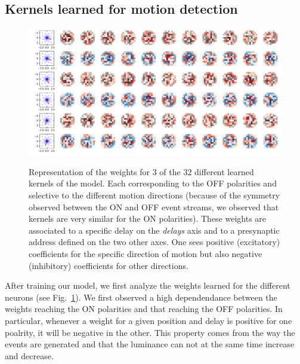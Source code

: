 \documentclass[default]{sn-jnl}%
\theoremstyle{thmstyleone}%
\theoremstyle{thmstyletwo}%
\theoremstyle{thmstylethree}%
\newcommand{\seeFig}[1]{see Fig.~\ref{fig:#1}}%
\begin{document}
\subsection{Kernels learned for motion detection}
\begin{figure}[ht!]
    {\centering
    \includegraphics[width=\linewidth]{figures/motion_kernels.pdf}
    }
    \caption{
    	Representation of the weights for $3$ of the $32$ different learned kernels of the model. Each corresponding to the OFF polarities and selective to the different motion directions (because of the symmetry observed between the ON and OFF event streams, we observed that kernels are very similar for the ON polarities). These weights are associated to a specific delay on the \textit{delays} axis and to a presynaptic address defined on the two other axes. %
        One sees positive (excitatory) coefficients for the specific direction of motion but also negative (inhibitory) coefficients for other directions.
	}
    \label{fig:kernels}
\end{figure} 
%
%
After training our model, we first analyze the weights learned for the different neurons (\seeFig{kernels}). 
We first observed a high dependendance between the weights reaching the ON polarities and that reaching the OFF polarities. In particular, whenever a weight for a given position and delay is positive for one poalrity, it will be negative in the other. This property comes from the way the events are generated and that the luminance can not at the same time increase and decrease. %
\end{document}
